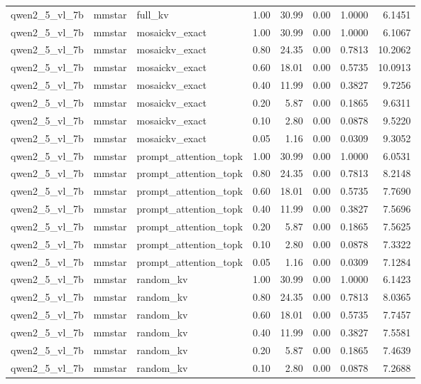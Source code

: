 \begin{longtable}{lllrrrrr}
qwen2\_5\_vl\_7b & mmstar & full\_kv & 1.00 & 30.99 & 0.00 & 1.0000 & 6.1451 \\
qwen2\_5\_vl\_7b & mmstar & mosaickv\_exact & 1.00 & 30.99 & 0.00 & 1.0000 & 6.1067 \\
qwen2\_5\_vl\_7b & mmstar & mosaickv\_exact & 0.80 & 24.35 & 0.00 & 0.7813 & 10.2062 \\
qwen2\_5\_vl\_7b & mmstar & mosaickv\_exact & 0.60 & 18.01 & 0.00 & 0.5735 & 10.0913 \\
qwen2\_5\_vl\_7b & mmstar & mosaickv\_exact & 0.40 & 11.99 & 0.00 & 0.3827 & 9.7256 \\
qwen2\_5\_vl\_7b & mmstar & mosaickv\_exact & 0.20 & 5.87 & 0.00 & 0.1865 & 9.6311 \\
qwen2\_5\_vl\_7b & mmstar & mosaickv\_exact & 0.10 & 2.80 & 0.00 & 0.0878 & 9.5220 \\
qwen2\_5\_vl\_7b & mmstar & mosaickv\_exact & 0.05 & 1.16 & 0.00 & 0.0309 & 9.3052 \\
qwen2\_5\_vl\_7b & mmstar & prompt\_attention\_topk & 1.00 & 30.99 & 0.00 & 1.0000 & 6.0531 \\
qwen2\_5\_vl\_7b & mmstar & prompt\_attention\_topk & 0.80 & 24.35 & 0.00 & 0.7813 & 8.2148 \\
qwen2\_5\_vl\_7b & mmstar & prompt\_attention\_topk & 0.60 & 18.01 & 0.00 & 0.5735 & 7.7690 \\
qwen2\_5\_vl\_7b & mmstar & prompt\_attention\_topk & 0.40 & 11.99 & 0.00 & 0.3827 & 7.5696 \\
qwen2\_5\_vl\_7b & mmstar & prompt\_attention\_topk & 0.20 & 5.87 & 0.00 & 0.1865 & 7.5625 \\
qwen2\_5\_vl\_7b & mmstar & prompt\_attention\_topk & 0.10 & 2.80 & 0.00 & 0.0878 & 7.3322 \\
qwen2\_5\_vl\_7b & mmstar & prompt\_attention\_topk & 0.05 & 1.16 & 0.00 & 0.0309 & 7.1284 \\
qwen2\_5\_vl\_7b & mmstar & random\_kv & 1.00 & 30.99 & 0.00 & 1.0000 & 6.1423 \\
qwen2\_5\_vl\_7b & mmstar & random\_kv & 0.80 & 24.35 & 0.00 & 0.7813 & 8.0365 \\
qwen2\_5\_vl\_7b & mmstar & random\_kv & 0.60 & 18.01 & 0.00 & 0.5735 & 7.7457 \\
qwen2\_5\_vl\_7b & mmstar & random\_kv & 0.40 & 11.99 & 0.00 & 0.3827 & 7.5581 \\
qwen2\_5\_vl\_7b & mmstar & random\_kv & 0.20 & 5.87 & 0.00 & 0.1865 & 7.4639 \\
qwen2\_5\_vl\_7b & mmstar & random\_kv & 0.10 & 2.80 & 0.00 & 0.0878 & 7.2688 \\

\end{longtable}
